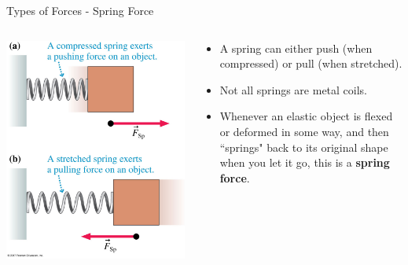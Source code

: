 \documentclass{beamer}
\begin{document}
\begin{frame}{Types of Forces - Spring Force}
\begin{columns}
\begin{column}{0.5\textwidth}
\begin{center}
   \includegraphics[width=\textwidth]{../figures/05_04_Figure.jpg}
\end{center}
\end{column}
\begin{column}{0.5\textwidth}
\begin{itemize}
   \item A spring can either push (when compressed) or pull (when stretched).
   \item Not all springs are metal coils.
   \item Whenever an elastic object is flexed or deformed in some way, and then ``springs" back to its original shape when you let it go, this is a {\bf spring force}.
\end{itemize}
\end{column}
\end{columns}
\end{frame}
\end{document}
